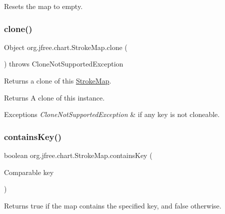 Resets the map to empty. \mbox{\label{classorg_1_1jfree_1_1chart_1_1_stroke_map_a0eeae03ad56a15ecb901fd6207271a33}} 
\subsubsection{\texorpdfstring{clone()}{clone()}}
{\footnotesize\ttfamily Object org.\+jfree.\+chart.\+Stroke\+Map.\+clone (\begin{DoxyParamCaption}{ }\end{DoxyParamCaption}) throws Clone\+Not\+Supported\+Exception}

Returns a clone of this {\ttfamily \mbox{\hyperlink{classorg_1_1jfree_1_1chart_1_1_stroke_map}{Stroke\+Map}}}.

\begin{DoxyReturn}{Returns}
A clone of this instance.
\end{DoxyReturn}

\begin{DoxyExceptions}{Exceptions}
{\em Clone\+Not\+Supported\+Exception} & if any key is not cloneable. \\
\hline
\end{DoxyExceptions}
\mbox{\label{classorg_1_1jfree_1_1chart_1_1_stroke_map_a2a3f1c8eb5c1f2698c391e61c30bf45e}} 
\subsubsection{\texorpdfstring{contains\+Key()}{containsKey()}}
{\footnotesize\ttfamily boolean org.\+jfree.\+chart.\+Stroke\+Map.\+contains\+Key (\begin{DoxyParamCaption}\item[{Comparable}]{key }\end{DoxyParamCaption})}

Returns {\ttfamily true} if the map contains the specified key, and {\ttfamily false} otherwise.


